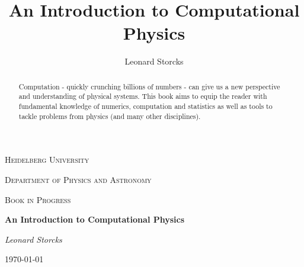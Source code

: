 \documentclass[a4paper, 12pt]{article}
\title{An Introduction to Computational Physics}
\author{Leonard Storcks}
\theoremstyle{definition}
\begin{document}
\begin{titlepage}
	\centering
	{\scshape\LARGE Heidelberg University \par}
	\vspace{0.5cm}
	{\scshape\LARGE Department of Physics and Astronomy \par}
	\vspace{1cm}
	{\scshape\Large Book in Progress\par}
	\vspace{1.5cm}
	{\huge\bfseries An Introduction to Computational Physics \par}
	\vspace{2cm}
	{\Large\itshape Leonard Storcks\par}
	\vfill
    \par
	\vfill
\vfill

	{\large \today\par}

\end{titlepage}


\begin{abstract}
Computation - quickly crunching billions of numbers - can give us a new perspective and understanding of physical systems. This book aims to equip the reader with fundamental knowledge of numerics, computation and statistics as well as tools to tackle problems from physics (and many other disciplines).
\end{abstract}

\thispagestyle{empty}

\pagebreak

\thispagestyle{plain}

\tableofcontents
\end{document}
